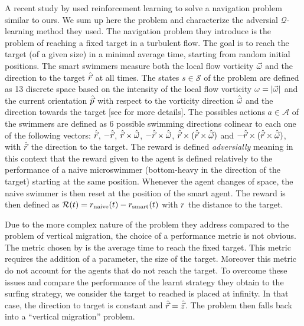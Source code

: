 A recent study by \citet{Alageshan2020} used reinforcement learning to solve a navigation problem similar to ours.
We sum up here the problem and characterize the adversial $\mathcal{Q}$-learning method they used.
The navigation problem they introduce is the problem of reaching a fixed target in a turbulent flow.
The goal is to reach the target (of a given size) in a minimal average time, starting from random initial positions.
The smart swimmers measure both the local flow vorticity $\vec{\omega}$ and the direction to the target $\hat{\vec{r}}$ at all times.
The states $s \in \mathcal{S}$ of the problem are defined as 13 discrete space based on the intensity of the local flow vorticity $\omega = \lvert\vec{\omega}\rvert$ and the current orientation $\hat{\vec{p}}$ with respect to the vorticity direction $\hat{\vec{\omega}}$ and the direction towards the target [see \citet{alageshan2020machine} for more details].
The possibles actions $a \in \mathcal{A}$ of the swimmers are defined as 6 possible swimming directions colinear to each one of the following vectors: $\hat{\vec{r}}$, $-\hat{\vec{r}}$, $\hat{\vec{r}} \times \hat{\vec{\omega}}$, $-\hat{\vec{r}} \times \hat{\vec{\omega}}$, $\hat{\vec{r}} \times (\hat{\vec{r}} \times \hat{\vec{\omega}})$ and $-\hat{\vec{r}} \times (\hat{\vec{r}} \times \hat{\vec{\omega}})$, with $\hat{\vec{r}}$ the direction to the target.
The reward is defined \textit{adversially} meaning in this context that the reward given to the agent is defined relatively to the performance of a naive microswimmer (bottom-heavy in the direction of the target) starting at the same position.
Whenever the agent changes of space, the naive swimmer is then reset at the position of the smart agent.
The reward is then defined as $\mathcal{R}(t) = r_{\mathrm{naive}}(t) - r_{\mathrm{smart}}(t)$ with $r$ the distance to the target.

Due to the more complex nature of the problem they address compared to the problem of vertical migration, the choice of a performance metric is not obvious.
The metric chosen by \citet{Alageshan2020} is the average time to reach the fixed target. 
This metric requires the addition of a parameter, the size of the target. 
Moreover this metric do not account for the agents that do not reach the target.
To overcome these issues and compare the performance of the learnt strategy they obtain to the surfing strategy, we consider the target to reached is placed at infinity.
In that case, the direction to target is constant and $\hat{\vec{r}} = \hat{\vec{z}}$.
The problem then falls back into a ``vertical migration'' problem.

